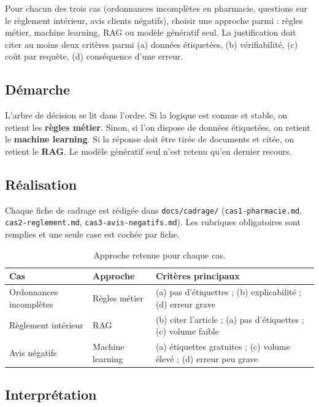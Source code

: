 \documentclass[11pt,a4paper]{article}
\begin{document}
\begin{enonce}
Pour chacun des trois cas (ordonnances incomplètes en pharmacie, questions sur le règlement intérieur, avis clients négatifs), choisir une approche parmi : règles métier, machine learning, RAG ou modèle génératif seul. La justification doit citer au moins deux critères parmi (a) données étiquetées, (b) vérifiabilité, (c) coût par requête, (d) conséquence d'une erreur.
\end{enonce}

\subsection{Démarche}

L'arbre de décision se lit dans l'ordre. Si la logique est connue et stable, on retient les \textbf{règles métier}. Sinon, si l'on dispose de données étiquetées, on retient le \textbf{machine learning}. Si la réponse doit être tirée de documents et citée, on retient le \textbf{RAG}. Le modèle génératif seul n'est retenu qu'en dernier recours.

\subsection{Réalisation}

Chaque fiche de cadrage est rédigée dans \texttt{docs/cadrage/} (\texttt{cas1-pharmacie.md}, \texttt{cas2-reglement.md}, \texttt{cas3-avis-negatifs.md}). Les rubriques obligatoires sont remplies et une seule case est cochée par fiche.

\begin{table}[H]
\centering
\begin{tabular}{llp{7cm}}
\toprule
\textbf{Cas} & \textbf{Approche} & \textbf{Critères principaux} \\
\midrule
Ordonnances incomplètes & Règles métier & (a) pas d'étiquettes ; (b) explicabilité ; (d) erreur grave \\
Règlement intérieur & RAG & (b) citer l'article ; (a) pas d'étiquettes ; (c) volume faible \\
Avis négatifs & Machine learning & (a) étiquettes gratuites ; (c) volume élevé ; (d) erreur peu grave \\
\bottomrule
\end{tabular}
\caption{Approche retenue pour chaque cas.}
\end{table}

\subsection{Interprétation}
\end{document}
